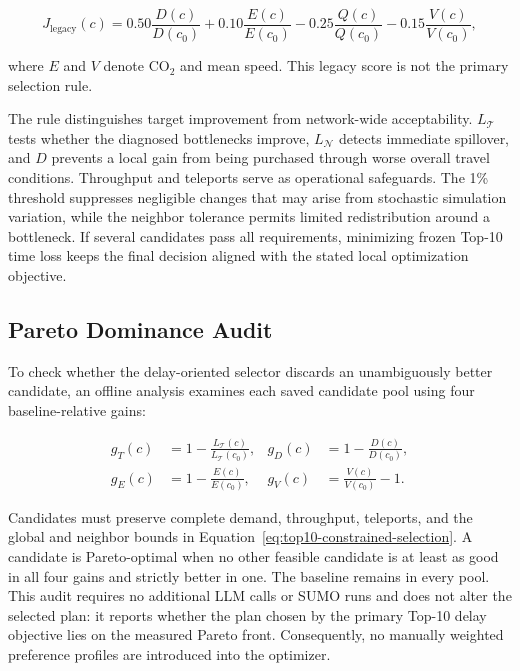 \begin{equation}
J_{\mathrm{legacy}}(c)=
0.50\frac{D(c)}{D(c_0)}+0.10\frac{E(c)}{E(c_0)}
-0.25\frac{Q(c)}{Q(c_0)}-0.15\frac{V(c)}{V(c_0)},
\label{eq:legacy-objective}
\end{equation}

where $E$ and $V$ denote $\mathrm{CO}_2$ and mean speed.  This legacy score is
not the primary selection rule.

The rule distinguishes target improvement from network-wide acceptability.
$L_{\mathcal{T}}$ tests whether the diagnosed bottlenecks improve,
$L_{\mathcal{N}}$ detects immediate spillover, and $D$ prevents a local gain
from being purchased through worse overall travel conditions.  Throughput and
teleports serve as operational safeguards.  The 1\% threshold suppresses
negligible changes that may arise from stochastic simulation variation, while
the neighbor tolerance permits limited redistribution around a bottleneck.  If
several candidates pass all requirements, minimizing frozen Top-10 time loss
keeps the final decision aligned with the stated local optimization objective.

\subsection{Pareto Dominance Audit}
\label{sec:pareto-method}

To check whether the delay-oriented selector discards an unambiguously better
candidate, an offline analysis examines each saved candidate pool using four
baseline-relative gains:

\begin{equation}
\begin{aligned}
g_T(c) &= 1-\frac{L_{\mathcal{T}}(c)}{L_{\mathcal{T}}(c_0)}, &
g_D(c) &= 1-\frac{D(c)}{D(c_0)},\\
g_E(c) &= 1-\frac{E(c)}{E(c_0)}, &
g_V(c) &= \frac{V(c)}{V(c_0)}-1.
\end{aligned}
\label{eq:pareto-gains}
\end{equation}

Candidates must preserve complete demand, throughput, teleports, and the global
and neighbor bounds in Equation~\ref{eq:top10-constrained-selection}.  A
candidate is Pareto-optimal when no other feasible candidate is at least as
good in all four gains and strictly better in one.  The baseline remains in
every pool.  This audit requires no additional LLM calls or SUMO runs and does
not alter the selected plan: it reports whether the plan chosen by the primary
Top-10 delay objective lies on the measured Pareto front.  Consequently, no
manually weighted preference profiles are introduced into the optimizer.
